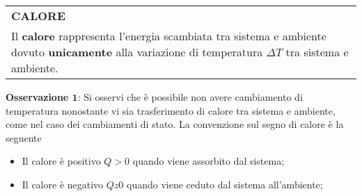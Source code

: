\documentclass[a4paper]{extarticle}
\renewcommand\arraystretch{}
\begin{document}
\vspace{1em}
\setlength{\tabcolsep}{14pt}
\renewcommand{\arraystretch}{2}
\noindent
\begin{tabularx}{\textwidth}{@{}|P|@{}}
    \hline
    {\textbf{CALORE}}\\
    \parbox{\linewidth}{Il \textbf{calore} rappresenta l'energia scambiata tra sistema e ambiente dovuto \textbf{unicamente} alla variazione di temperatura $\Delta T$ tra sistema e ambiente.\vspace{3mm}}\\
    \hline
\end{tabularx}

\vspace{2em}
\noindent
\textbf{Osservazione $\boldsymbol{1}$}: Si osservi che è possibile non avere cambiamento di temperatura nonostante vi sia trasferimento di calore tra sistema e ambiente, come nel caso dei cambiamenti di stato. La convenzione sul segno di calore è la seguente
\begin{itemize}
  \item Il calore è positivo $Q > 0$ quando viene assorbito dal sistema;
  \item Il calore è negativo $Q z 0$ quando viene ceduto dal sistema all'ambiente;
\end{itemize}
\end{document}
